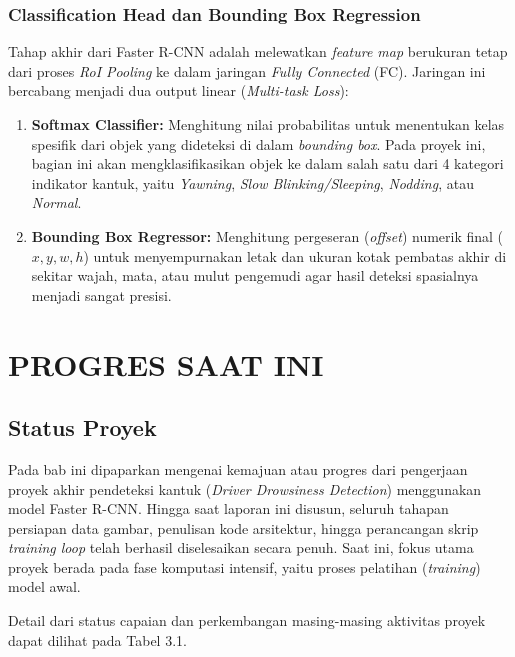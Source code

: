 \documentclass[11pt,a4paper,oneside]{report}
\begin{document}
\subsection{Classification Head dan Bounding Box Regression}
Tahap akhir dari Faster R-CNN adalah melewatkan \textit{feature map} berukuran tetap dari proses \textit{RoI Pooling} ke dalam jaringan \textit{Fully Connected} (FC). Jaringan ini bercabang menjadi dua output linear (\textit{Multi-task Loss}):
\begin{enumerate}
    \item \textbf{Softmax Classifier:} Menghitung nilai probabilitas untuk menentukan kelas spesifik dari objek yang dideteksi di dalam \textit{bounding box}. Pada proyek ini, bagian ini akan mengklasifikasikan objek ke dalam salah satu dari 4 kategori indikator kantuk, yaitu \textit{Yawning}, \textit{Slow Blinking/Sleeping}, \textit{Nodding}, atau \textit{Normal}.
    \item \textbf{Bounding Box Regressor:} Menghitung pergeseran (\textit{offset}) numerik final ($x, y, w, h$) untuk menyempurnakan letak dan ukuran kotak pembatas akhir di sekitar wajah, mata, atau mulut pengemudi agar hasil deteksi spasialnya menjadi sangat presisi.
\end{enumerate}

\chapter{PROGRES SAAT INI}

\section{Status Proyek}

Pada bab ini dipaparkan mengenai kemajuan atau progres dari pengerjaan proyek akhir pendeteksi kantuk (\textit{Driver Drowsiness Detection}) menggunakan model Faster R-CNN. Hingga saat laporan ini disusun, seluruh tahapan persiapan data gambar, penulisan kode arsitektur, hingga perancangan skrip \textit{training loop} telah berhasil diselesaikan secara penuh. Saat ini, fokus utama proyek berada pada fase komputasi intensif, yaitu proses pelatihan (\textit{training}) model awal.

Detail dari status capaian dan perkembangan masing-masing aktivitas proyek dapat dilihat pada Tabel 3.1.
\end{document}
